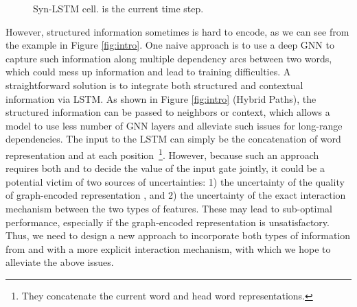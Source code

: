 \documentclass[11pt]{article}
\begin{document}
\begin{figure}
{
}
\caption{Syn-LSTM cell.  is the current time step.}
\label{fig:Syn-LSTM}
\end{figure}






However, structured information sometimes is hard to encode, as we can see {\color{black}from the example in} Figure \ref{fig:intro}. 
One naive approach is to use a deep GNN to capture {\color{black}such information} along multiple dependency arcs between two words, which could mess up information and lead to training difficulties. 
A straightforward solution is to integrate both structured and contextual information via LSTM. 
As shown in Figure \ref{fig:intro} (Hybrid Paths), the structured information can be passed to neighbors or context, which allows a model to use less number of GNN layers and alleviate such issues for long-range dependencies.
The input to the LSTM can simply be the concatenation of word representation  and  at each position~\cite{Jie2019DependencyGuidedLF}\footnote{They concatenate the current word and head word representations.}.  
However, because such an approach requires both  and  to  decide the value of the input gate jointly, it could be a potential victim of two sources of uncertainties: 1) the uncertainty of the quality of graph-encoded representation , and 2) the uncertainty of the exact interaction mechanism between the two types of features. 
These may lead to sub-optimal performance, especially if the graph-encoded representation  is unsatisfactory.
Thus, we need to design a new approach to incorporate both types of information from  and  with a more explicit interaction mechanism, with which we hope to alleviate the above issues.
\end{document}
